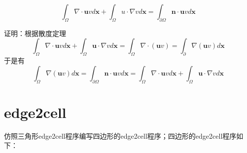 \documentclass{article}
\begin{document}
\begin{equation}
    \int_{\Omega}\nabla\cdot \pmb{u} vd\pmb{x}+\int_{\Omega}u\cdot\nabla vd\pmb{x}=\int_{\partial \Omega}\pmb{n}\cdot \pmb{u}v d\pmb{x}
\end{equation}

证明：根据散度定理\[\int_{\Omega}\nabla\cdot \pmb{u} vd\pmb{x}+\int_{\Omega}\pmb{u}\cdot\nabla vd\pmb{x}=\int_{\Omega}\nabla\cdot\left(\pmb{u}v\right)=\int_{\partial}\nabla\left(\pmb{u}v\right) d\pmb{x}\]
于是有\[\int_{\Omega}\nabla\left(\pmb{u}v\right)d\pmb{x}=\int_{\partial \Omega}\pmb{n}\cdot \pmb{u}vd\pmb{x}=\int_{\Omega}\nabla\cdot \pmb{u} vd\pmb{x}+\int_{\Omega}\pmb{u}\cdot\nabla vd\pmb{x}\]

\section{edge2cell}

仿照三角形edge2cell程序编写四边形的edge2cell程序；四边形的edge2cell程序如下：
\end{document}
